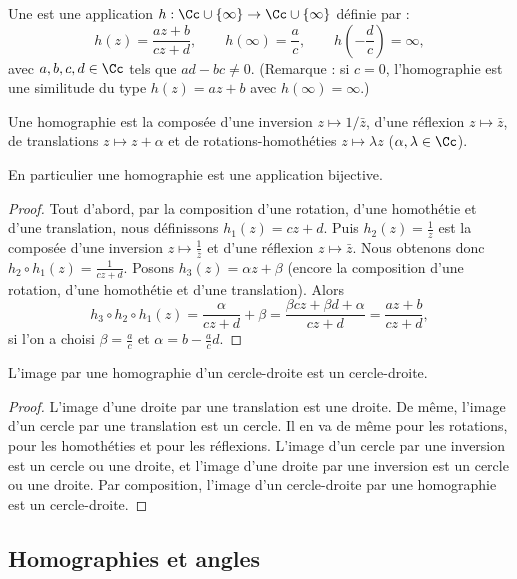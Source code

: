 \documentclass[11pt,class=report,crop=false]{standalone}
\begin{document}
Une  est une application $h : \Cc \cup \{\infty\} \to \Cc \cup \{\infty\}$
définie par :
$$h(z) = \frac{az+b}{cz+d}, \qquad h(\infty)=\frac ac, \qquad h\left(-\frac{d}{c}\right)=\infty,$$
avec $a,b,c,d \in \Cc$ tels que $ad-bc \neq 0$.
(Remarque : si $c=0$, l'homographie est une similitude du type
$h(z) =az+b$ avec $h(\infty)=\infty$.)


\begin{proposition}
\label{prop:dechomo}
Une homographie est la composée d'une inversion $z \mapsto 1/\bar z$, d'une réflexion $z\mapsto \bar z$,
de translations $z\mapsto z+\alpha$ et de rotations-homothéties $z\mapsto \lambda z$ ($\alpha, \lambda \in \Cc$).
\end{proposition}

En particulier une homographie est une application bijective.

\begin{proof}
Tout d'abord, par la composition d'une rotation, d'une homothétie et d'une translation, nous définissons
$h_1(z) = cz+d$. Puis $h_2(z)= \frac 1z$ est la composée d'une inversion $z \mapsto \frac{1}{\bar z}$
et d'une réflexion $z \mapsto \bar z$. Nous obtenons donc 
$h_2 \circ h_1(z) = \frac{1}{cz+d}$.
Posons $h_3(z)= \alpha z + \beta$ (encore la composition d'une rotation, d'une homothétie et d'une translation).
Alors
$$h_3\circ h_2 \circ h_1(z) =  \frac{\alpha}{cz+d} + \beta = \frac{\beta c z + \beta d + \alpha}{cz+d}=\frac{az+b}{cz+d},$$
si l'on a choisi $\beta = \frac{a}{c}$ et $\alpha = b - \frac a c d$.
\end{proof}

\begin{corollaire}
L'image par une homographie d'un cercle-droite est un cercle-droite.
\end{corollaire}

\begin{proof}
L'image d'une droite par une translation est une droite. De même, l'image d'un cercle par une translation est un cercle.
Il en va de même pour les rotations, pour les homothéties et pour les réflexions.
L'image d'un cercle par une inversion est un cercle ou une droite, et l'image d'une droite
par une inversion est un cercle ou une droite. Par composition,
l'image d'un cercle-droite par une homographie est un cercle-droite.
\end{proof}




\subsection{Homographies et angles}
\end{document}
